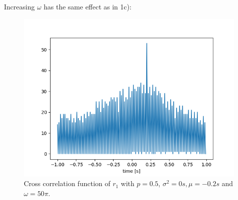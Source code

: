 \newpage
Increasing $\omega$ has the same effect as in 1c):
\begin{figure}[H]
\centering
\includegraphics[scale=0.7]{2_c_p=0_5_omega=50pi.png}
\caption{Cross correlation function of $r_1$ with $p=0.5$, $\sigma^2 = 0s, \mu = -0.2s$ and $\omega=50\pi$.}
\end{figure}